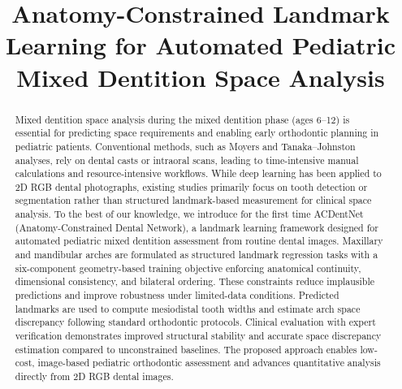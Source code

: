 \documentclass[conference]{IEEEtran}
\begin{document}
\title{Anatomy-Constrained Landmark Learning for Automated Pediatric Mixed Dentition Space Analysis}

\author{
\and
{}
\and
{}
}

\maketitle

\begin{abstract}
Mixed dentition space analysis during the mixed dentition phase (ages 6--12) is essential for
predicting space requirements and enabling early orthodontic planning in pediatric patients.
Conventional methods, such as Moyers and Tanaka--Johnston analyses, rely on dental casts or
intraoral scans, leading to time-intensive manual calculations and resource-intensive workflows.
While deep learning has been applied to 2D RGB dental photographs, existing studies primarily
focus on tooth detection or segmentation rather than structured landmark-based measurement for
clinical space analysis. To the best of our knowledge, we introduce for the first time
ACDentNet (Anatomy-Constrained Dental Network), a landmark learning framework designed for
automated pediatric mixed dentition assessment from routine dental images. Maxillary and
mandibular arches are formulated as structured landmark regression tasks with a six-component
geometry-based training objective enforcing anatomical continuity, dimensional consistency, and
bilateral ordering. These constraints reduce implausible predictions and improve robustness
under limited-data conditions. Predicted landmarks are used to compute mesiodistal tooth widths
and estimate arch space discrepancy following standard orthodontic protocols. Clinical
evaluation with expert verification demonstrates improved structural stability and accurate
space discrepancy estimation compared to unconstrained baselines. The proposed approach enables
low-cost, image-based pediatric orthodontic assessment and advances quantitative analysis
directly from 2D RGB dental images.
\end{abstract}
\end{document}
